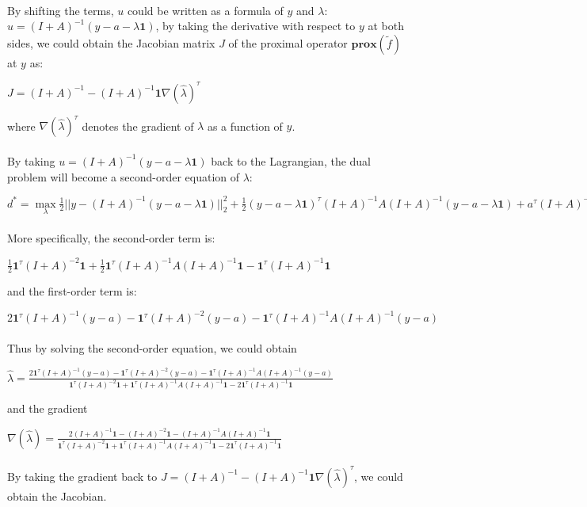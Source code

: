 \documentclass{article}
\begin{document}
\paragraph{}By shifting the terms, $u$ could be written as a formula of $y$ and $\lambda$: $u = (I+A)^{-1}(y-a-\lambda\textbf{1})$, by taking the derivative with respect to $y$ at both sides, we could obtain the Jacobian matrix $J$ of the proximal operator $\textbf{prox}(\tilde{f})$ at $y$ as:
\begin{center}
$J = (I+A)^{-1} -(I+A)^{-1}\textbf{1}\nabla(\hat{\lambda})^{\tau}$
\end{center}
where $\nabla(\hat{\lambda})^{\tau}$ denotes the gradient of $\lambda$ as a function of $y$.
\paragraph{}By taking $u = (I+A)^{-1}(y-a-\lambda\textbf{1})$ back to the Lagrangian, the dual problem will become a second-order equation of $\lambda$:
\begin{center}
$d^{*} = \max\limits_{\lambda} \frac{1}{2}||y-(I+A)^{-1}(y-a-\lambda\textbf{1})||_{2}^{2}+\frac{1}{2}(y-a-\lambda\textbf{1})^{\tau}(I+A)^{-1}A(I+A)^{-1}(y-a-\lambda\textbf{1})+a^{\tau}(I+A)^{-1}(y-a-\lambda\textbf{1})+\lambda*\textbf{1}^{\tau}(I+A)^{-1}(y-a-\lambda\textbf{1})$
\end{center}
\paragraph{}More specifically, the second-order term is:
\begin{center}
$\frac{1}{2}\textbf{1}^{\tau}(I+A)^{-2}\textbf{1}+\frac{1}{2}\textbf{1}^{\tau}(I+A)^{-1}A(I+A)^{-1}\textbf{1}-\textbf{1}^{\tau}(I+A)^{-1}\textbf{1}$
\end{center}
and the first-order term is:
\begin{center}
$2\textbf{1}^{\tau}(I+A)^{-1}(y-a)-\textbf{1}^{\tau}(I+A)^{-2}(y-a)-\textbf{1}^{\tau}(I+A)^{-1}A(I+A)^{-1}(y-a)$
\end{center}
\paragraph{}Thus by solving the second-order equation, we could obtain
\begin{center}
$\hat{\lambda} = \frac{2\textbf{1}^{\tau}(I+A)^{-1}(y-a)-\textbf{1}^{\tau}(I+A)^{-2}(y-a)-\textbf{1}^{\tau}(I+A)^{-1}A(I+A)^{-1}(y-a)}{\textbf{1}^{\tau}(I+A)^{-2}\textbf{1}+\textbf{1}^{\tau}(I+A)^{-1}A(I+A)^{-1}\textbf{1}-2\textbf{1}^{\tau}(I+A)^{-1}\textbf{1}}$
\end{center}
and the gradient
\begin{center}
$\nabla(\hat{\lambda}) = \frac{2(I+A)^{-1}\textbf{1}-(I+A)^{-2}\textbf{1}-(I+A)^{-1}A(I+A)^{-1}\textbf{1}}{\textbf{1}^{\tau}(I+A)^{-2}\textbf{1}+\textbf{1}^{\tau}(I+A)^{-1}A(I+A)^{-1}\textbf{1}-2\textbf{1}^{\tau}(I+A)^{-1}\textbf{1}}$
\end{center}
\paragraph{}By taking the gradient back to $J = (I+A)^{-1} -(I+A)^{-1}\textbf{1}\nabla(\hat{\lambda})^{\tau}$, we could obtain the Jacobian.
\end{document}
